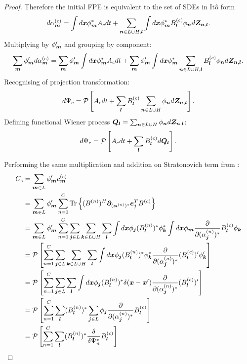 \begin{proof}
Therefore the initial FPE is equivalent to the set of SDEs in It\^{o} form
\[
	d\alpha_{\boldsymbol{m}}^{(c)}
	= \int d\boldsymbol{x} \phi_{\boldsymbol{m}}^* A_c dt
	+ \sum_{\boldsymbol{n} \in L \cup H, \boldsymbol{l}}
		\int d\boldsymbol{x} \phi_{\boldsymbol{m}}^* B_{\boldsymbol{l}}^{(c)} \phi_{\boldsymbol{n}} d\boldsymbol{Z}_{\boldsymbol{n},\boldsymbol{l}}.
\]
Multiplying by $\phi_{\boldsymbol{m}}^\prime$ and grouping by component:
\[
	\sum_{\boldsymbol{m}} \phi_{\boldsymbol{m}}^\prime d\alpha_{\boldsymbol{m}}^{(c)}
	= \sum_{\boldsymbol{m}} \phi_{\boldsymbol{m}}^\prime \int d\boldsymbol{x} \phi_{\boldsymbol{m}}^* A_c dt
	+ \sum_{\boldsymbol{m}} \phi_{\boldsymbol{m}}^\prime \int d\boldsymbol{x} \phi_{\boldsymbol{m}}^*
		\sum_{\boldsymbol{n} \in L \cup H, \boldsymbol{l}} B_{\boldsymbol{l}}^{(c)} \phi_{\boldsymbol{n}} d\boldsymbol{Z}_{\boldsymbol{n},\boldsymbol{l}}.
\]
Recognising  of projection transformation:
\[
	d\Psi_c
	= \mathcal{P} \left[
		A_c dt
		+ \sum_{\boldsymbol{l}} B_{\boldsymbol{l}}^{(c)}
			\sum_{\boldsymbol{n} \in L \cup H} \phi_{\boldsymbol{n}} d\boldsymbol{Z}_{\boldsymbol{n},\boldsymbol{l}}
	\right].
\]
Defining functional Wiener process $\bm{Q}_{\boldsymbol{l}} = \sum_{\boldsymbol{n} \in L \cup H} \phi_{\boldsymbol{n}} d\boldsymbol{Z}_{\boldsymbol{n},\boldsymbol{l}}$:
\[
	d\Psi_c
	= \mathcal{P} \left[
		A_c dt
		+ \sum_{\boldsymbol{l}} B_{\boldsymbol{l}}^{(c)} d\bm{Q}_{\boldsymbol{l}}
	\right].
\]

Performing the same multiplication and addition on Stratonovich term from :
\begin{equation*}
\begin{split}
	C_c
	& = \sum_{\boldsymbol{m} \in L} \phi_{\boldsymbol{m}}^\prime c_{\boldsymbol{m}}^{(c)} \\
	& = \sum_{\boldsymbol{m} \in L} \phi_{\boldsymbol{m}}^\prime \sum_{n=1}^C \mathrm{Tr} \left\{ 
		(B^{(n)})^H \boldsymbol{\partial}_{(\boldsymbol{\alpha}^{(n)})^*} \boldsymbol{e}_j^T B^{(c)}
	 \right\} \\
	& = \sum_{\boldsymbol{m} \in L} \phi_{\boldsymbol{m}}^\prime \sum_{n=1}^C
		\sum_{\boldsymbol{j} \in L} \sum_{\boldsymbol{k} \in L \cup H} \sum_{\boldsymbol{l}}
		\int d\boldsymbol{x} \phi_{\boldsymbol{j}} (B_{\boldsymbol{l}}^{(n)})^* \phi_{\boldsymbol{k}}^*
		\int d\boldsymbol{x} \phi_{\boldsymbol{m}}
			\frac{\partial}{\partial (\alpha_{\boldsymbol{j}}^{(n)})^*} B_{\boldsymbol{l}}^{(c)} \phi_{\boldsymbol{k}} \\
	& = \mathcal{P} \left[
		\sum_{n=1}^C
		\sum_{\boldsymbol{j} \in L} \sum_{\boldsymbol{k} \in L \cup H} \sum_{\boldsymbol{l}}
		\int d\boldsymbol{x} \phi_{\boldsymbol{j}} (B_{\boldsymbol{l}}^{(n)})^* \phi_{\boldsymbol{k}}^*
		\frac{\partial}{\partial (\alpha_{\boldsymbol{j}}^{(n)})^*} (B_{\boldsymbol{l}}^{(c)})^\prime \phi_{\boldsymbol{k}}^\prime
	\right] \\
	& = \mathcal{P} \left[
		\sum_{n=1}^C
		\sum_{\boldsymbol{j} \in L} \sum_{\boldsymbol{l}}
		\int d\boldsymbol{x} \phi_{\boldsymbol{j}} (B_{\boldsymbol{l}}^{(n)})^* \delta(\boldsymbol{x} - \boldsymbol{x}^\prime)
		\frac{\partial}{\partial (\alpha_{\boldsymbol{j}}^{(n)})^*} (B_{\boldsymbol{l}}^{(c)})^\prime
	\right] \\
	& = \mathcal{P} \left[
		\sum_{n=1}^C \sum_{\boldsymbol{l}}
		(B_{\boldsymbol{l}}^{(n)})^*
		\sum_{\boldsymbol{j} \in L}
		\phi_{\boldsymbol{j}} \frac{\partial}{\partial (\alpha_{\boldsymbol{j}}^{(n)})^*} B_{\boldsymbol{l}}^{(c)}
	\right] \\
	& = \mathcal{P} \left[
		\sum_{n=1}^C \sum_{\boldsymbol{l}}
		(B_{\boldsymbol{l}}^{(n)})^*
		\frac{\delta}{\delta \Psi_n^*}
		B_{\boldsymbol{l}}^{(c)}
	\right]
\end{split}
\end{equation*}
\end{proof}


